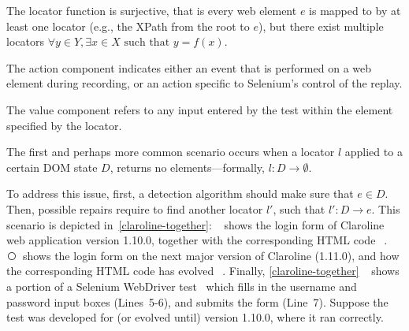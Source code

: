 The locator function is surjective, that is every web element $e$ is mapped to by at least one locator (e.g., the XPath from the root to $e$), but there exist multiple locators {$\displaystyle \forall y\in Y,\exists x\in X{\text{ such that }}y=f(x).$} 

\begin{defn}
The action component indicates either an event that is performed
on a web element during recording, or an action specific to Selenium's control of the replay.
\end{defn}

\begin{defn} The value component refers to any input entered by the test within the element specified by the locator.
\end{defn}

The first and perhaps more common scenario occurs when a locator $l$ applied to a certain DOM state $D$, returns no elements---formally, $l: D \rightarrow \emptyset$. 

To address this issue, first, a detection algorithm should make sure that $e \in D$. Then,  possible repairs require to find another locator $l'$, such that $l': D \rightarrow e$.
This scenario is depicted in~\autoref{claroline-together}: \textcircled{}~shows the login form of Claroline web application version 1.10.0, together with the corresponding HTML code~\textcircled{}. \textcircled{}~shows the login form on the next major version of Claroline (1.11.0), and how the corresponding HTML code has evolved~\textcircled{}. 
Finally, \autoref{claroline-together}~\textcircled{} shows a portion of a Selenium WebDriver test~\cite{selenium} which 
fills in the username and password input boxes (Lines~5-6), and submits the form (Line~7). Suppose the test was developed for (or evolved until) version 1.10.0, where it ran correctly.

